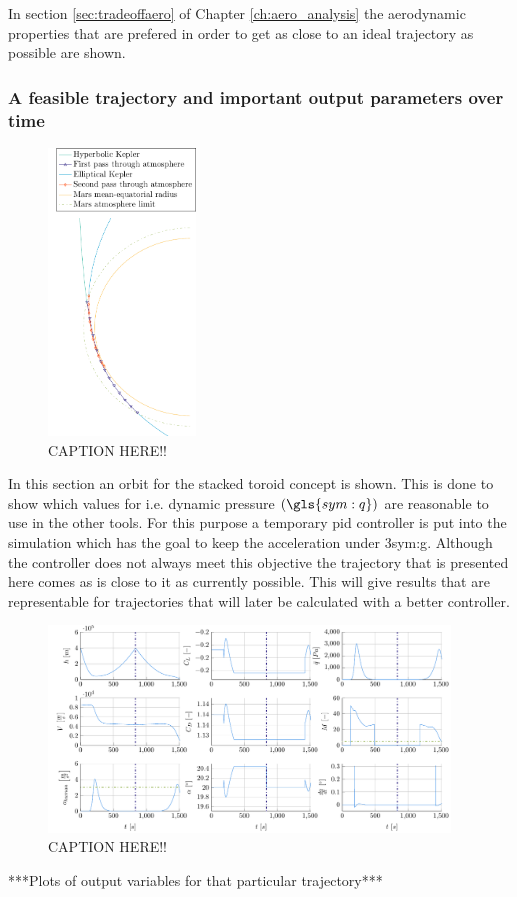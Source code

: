In section \ref{sec:tradeoffaero} of Chapter \ref{ch:aero_analysis} the aerodynamic properties that are prefered in order to get as close to an ideal trajectory as possible are shown.

\subsubsection{A feasible trajectory and important output parameters over time}
\label{sec:astrorestraj}
\begin{figure}
	\centering
	\includegraphics[width=0.35\textwidth]{Figure/orbital_model/orbit.pdf}
	\caption{ CAPTION HERE!! }
	\label{fig:orbit}
\end{figure}

In this section an orbit for the stacked toroid concept is shown. This is done to show which values for i.e. dynamic pressure $\left(\gls{sym:q}\right)$ are reasonable to use in the other tools. For this purpose a temporary \gls{pid} controller is put into the simulation which has the goal to keep the acceleration under 3\gls{sym:g}. Although the controller does not always meet this objective the trajectory that is presented here comes as is close to it as currently possible. This will give results that are representable for trajectories that will later be calculated with a better controller.

\begin{figure}
	\centering
	\includegraphics[width=0.95\textwidth]{Figure/orbital_model/orbit_results.pdf}
	\caption{ CAPTION HERE!! }
	\label{fig:orbit_results}
\end{figure}

***Plots of output variables for that particular trajectory***\\